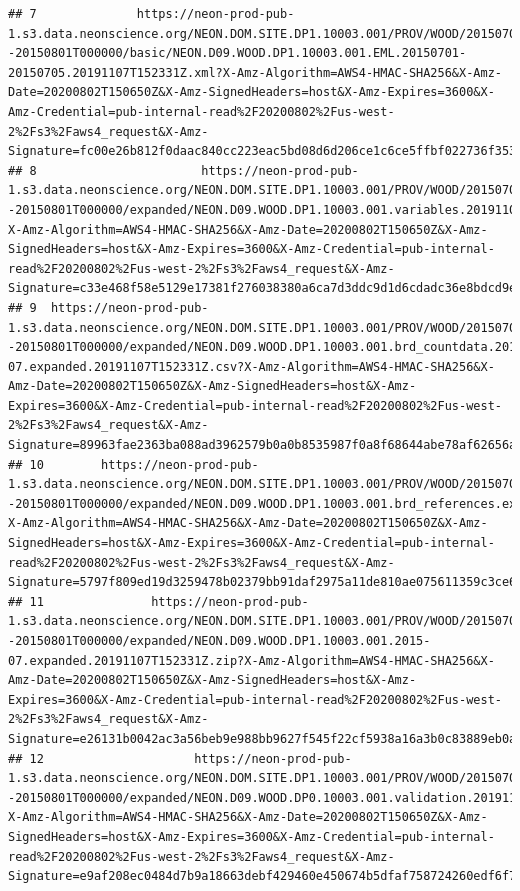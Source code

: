 \documentclass[]{book}
\begin{document}
\begin{verbatim}
## 7              https://neon-prod-pub-1.s3.data.neonscience.org/NEON.DOM.SITE.DP1.10003.001/PROV/WOOD/20150701T000000--20150801T000000/basic/NEON.D09.WOOD.DP1.10003.001.EML.20150701-20150705.20191107T152331Z.xml?X-Amz-Algorithm=AWS4-HMAC-SHA256&X-Amz-Date=20200802T150650Z&X-Amz-SignedHeaders=host&X-Amz-Expires=3600&X-Amz-Credential=pub-internal-read%2F20200802%2Fus-west-2%2Fs3%2Faws4_request&X-Amz-Signature=fc00e26b812f0daac840cc223eac5bd08d6d206ce1c6ce5ffbf022736f3530ae
## 8                       https://neon-prod-pub-1.s3.data.neonscience.org/NEON.DOM.SITE.DP1.10003.001/PROV/WOOD/20150701T000000--20150801T000000/expanded/NEON.D09.WOOD.DP1.10003.001.variables.20191107T152331Z.csv?X-Amz-Algorithm=AWS4-HMAC-SHA256&X-Amz-Date=20200802T150650Z&X-Amz-SignedHeaders=host&X-Amz-Expires=3600&X-Amz-Credential=pub-internal-read%2F20200802%2Fus-west-2%2Fs3%2Faws4_request&X-Amz-Signature=c33e468f58e5129e17381f276038380a6ca7d3ddc9d1d6cdadc36e8bdcd9e29a
## 9  https://neon-prod-pub-1.s3.data.neonscience.org/NEON.DOM.SITE.DP1.10003.001/PROV/WOOD/20150701T000000--20150801T000000/expanded/NEON.D09.WOOD.DP1.10003.001.brd_countdata.2015-07.expanded.20191107T152331Z.csv?X-Amz-Algorithm=AWS4-HMAC-SHA256&X-Amz-Date=20200802T150650Z&X-Amz-SignedHeaders=host&X-Amz-Expires=3600&X-Amz-Credential=pub-internal-read%2F20200802%2Fus-west-2%2Fs3%2Faws4_request&X-Amz-Signature=89963fae2363ba088ad3962579b0a0b8535987f0a8f68644abe78af62656a8f1
## 10        https://neon-prod-pub-1.s3.data.neonscience.org/NEON.DOM.SITE.DP1.10003.001/PROV/WOOD/20150701T000000--20150801T000000/expanded/NEON.D09.WOOD.DP1.10003.001.brd_references.expanded.20191107T152331Z.csv?X-Amz-Algorithm=AWS4-HMAC-SHA256&X-Amz-Date=20200802T150650Z&X-Amz-SignedHeaders=host&X-Amz-Expires=3600&X-Amz-Credential=pub-internal-read%2F20200802%2Fus-west-2%2Fs3%2Faws4_request&X-Amz-Signature=5797f809ed19d3259478b02379bb91daf2975a11de810ae075611359c3ce6289
## 11               https://neon-prod-pub-1.s3.data.neonscience.org/NEON.DOM.SITE.DP1.10003.001/PROV/WOOD/20150701T000000--20150801T000000/expanded/NEON.D09.WOOD.DP1.10003.001.2015-07.expanded.20191107T152331Z.zip?X-Amz-Algorithm=AWS4-HMAC-SHA256&X-Amz-Date=20200802T150650Z&X-Amz-SignedHeaders=host&X-Amz-Expires=3600&X-Amz-Credential=pub-internal-read%2F20200802%2Fus-west-2%2Fs3%2Faws4_request&X-Amz-Signature=e26131b0042ac3a56beb9e988bb9627f545f22cf5938a16a3b0c83889eb0acd4
## 12                     https://neon-prod-pub-1.s3.data.neonscience.org/NEON.DOM.SITE.DP1.10003.001/PROV/WOOD/20150701T000000--20150801T000000/expanded/NEON.D09.WOOD.DP0.10003.001.validation.20191107T152331Z.csv?X-Amz-Algorithm=AWS4-HMAC-SHA256&X-Amz-Date=20200802T150650Z&X-Amz-SignedHeaders=host&X-Amz-Expires=3600&X-Amz-Credential=pub-internal-read%2F20200802%2Fus-west-2%2Fs3%2Faws4_request&X-Amz-Signature=e9af208ec0484d7b9a18663debf429460e450674b5dfaf758724260edf6f7982

\end{verbatim}
\end{document}
